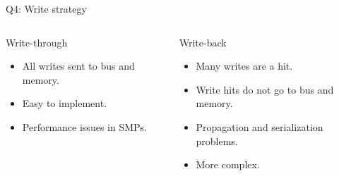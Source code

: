 \begin{frame}[t]{Q4: Write strategy}
\begin{columns}[T]

\begin{column}{.5\textwidth}
\begin{block}{Write-through}
\begin{itemize}
  \item All writes sent to bus and memory.
  \item Easy to implement.
  \item Performance issues in SMPs.
\end{itemize}
\end{block}
\end{column}

\pause
\begin{column}{.5\textwidth}
\begin{block}{Write-back}
\begin{itemize}
  \item Many writes are a hit.
  \item Write hits do \alert{not} go to bus and memory.
  \item Propagation and serialization problems.
  \item More complex.
\end{itemize}
\end{block}
\end{column}

\end{columns}
\end{frame}

